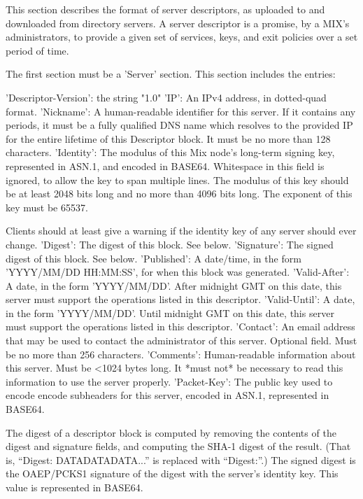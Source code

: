 This section describes the format of server descriptors, as uploaded
to and downloaded from directory servers.  A server descriptor is a
promise, by a MIX's administrators, to provide a given set of
services, keys, and exit policies over a set period of time.

The first section must be a 'Server' section.  This section includes
the entries:

     'Descriptor-Version':  the string "1.0"
     'IP': An IPv4 address, in dotted-quad format.
     'Nickname': A human-readable identifier for this server.  If it
         contains any periods, it must be a fully qualified DNS name
         which resolves to the provided IP for the entire lifetime of
         this Descriptor block.  It must be no more than 128 characters.
     'Identity': The modulus of this Mix node's long-term signing key,
         represented in ASN.1, and encoded in BASE64.  Whitespace in
         this field is ignored, to allow the key to span multiple
         lines.  The modulus of this key should be at least 2048 bits
         long and no more than 4096 bits long.  The exponent of this 
         key must be 65537.

	 Clients should at least give a warning if the identity key of
         any server should ever change.
     'Digest': The digest of this block. See below.
     'Signature': The signed digest of this block.  See below.
     'Published': A date/time, in the form 'YYYY/MM/DD HH:MM:SS',
         for when this block was generated.
     'Valid-After': A date, in the form 'YYYY/MM/DD'.  After midnight GMT
         on this date, this server must support the operations listed
         in this descriptor.
     'Valid-Until': A date, in the form 'YYYY/MM/DD'.  Until midnight
         GMT on this date, this server must support the operations listed
         in this descriptor.
     'Contact': An email address that may be used to contact the
         administrator of this server. Optional field.  Must be no
         more than 256 characters.
     'Comments': Human-readable information about this server.  Must
         be <1024 bytes long.  It *must not* be necessary to read this
         information to use the server properly.
     'Packet-Key': The public key used to encode encode subheaders for
         this server, encoded in ASN.1, represented in BASE64. 

The digest of a descriptor block is computed by removing the contents
of the digest and signature fields, and computing the SHA-1 digest of
the result.  (That is, ``Digest: DATADATADATA...'' is replaced with
``Digest:''.)  The signed digest is the OAEP/PCKS1 signature of the
digest with the server's identity key.  This value is represented in
BASE64.

